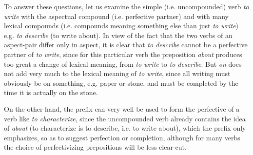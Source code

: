 To answer these questions, let us examine the simple (i.e. uncompounded) verb  \emph{to write} with the aspectual compound (i.e. perfective partner)  and with many lexical compounds (i.e. compounds meaning something else than just \emph{to write}) e.g.  \emph{to describe} (to write about). In view of the fact that the two verbs of an aspect-pair differ only in aspect, it is clear that  \emph{to describe} cannot be a perfective partner of  \emph{to write}, since for this particular verb the preposition  \emph{about} produces too great a change of lexical meaning, from \emph{to write} to \emph{to describe}. But  \emph{on} does not add very much to the lexical meaning of  \emph{to write}, since all writing must obviously be on something, e.g. paper or stone, and must be completed by the time it is actually on the stone.

On the other hand, the prefix  can very well be used to form the perfective of a verb like  \emph{to characterize}, since the uncompounded verb already contains the idea of \emph{about} (to characterize is to describe, i.e. to write about), which the prefix  only emphasizes, so as to suggest perfection or completion, although for many verbs the choice of perfectivizing prepositions will be less clear-cut.

